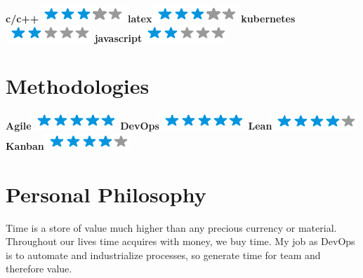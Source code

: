 \documentclass[]{friggeri-cv}
\begin{document}
\begin{aside}
        \textbf{c/c++}\includegraphics[scale=0.40]{img/3stars.png}
        \textbf{latex}\includegraphics[scale=0.40]{img/3stars.png}
        \textbf{kubernetes}\includegraphics[scale=0.40]{img/2stars.png}
        \textbf{javascript}\includegraphics[scale=0.40]{img/2stars.png}
        ~
    \section{Methodologies}
        \textbf{Agile}\includegraphics[scale=0.40]{img/5stars.png}
        \textbf{DevOps}\includegraphics[scale=0.40]{img/5stars.png}
        \textbf{Lean}\includegraphics[scale=0.40]{img/4stars.png}
        \textbf{Kanban}\includegraphics[scale=0.40]{img/4stars.png}
        ~
\end{aside}

\section{Personal Philosophy}
    Time is a store of value much higher than any precious currency or
    material. Throughout our lives time acquires with money, we buy time.
    My job as DevOps is to automate and industrialize processes,
    so generate time for team and therefore value.
\end{document}
